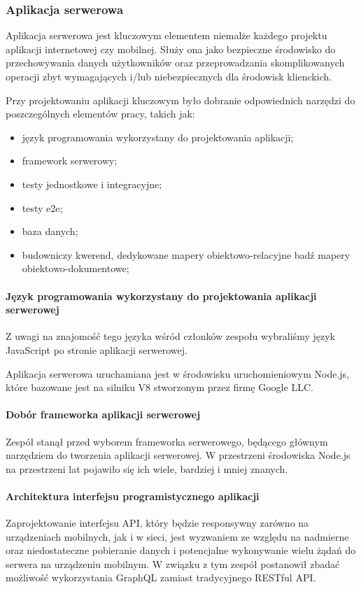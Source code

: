 \documentclass[12pt, a4paper, twoside, openany]{book}
\newcommand{\forceindent}{\leavevmode{\parindent=1.3em\indent}}
\begin{document}
{\subsubsection{Aplikacja serwerowa}

\forceindent Aplikacja serwerowa jest kluczowym elementem niemalże każdego projektu aplikacji
internetowej czy mobilnej. Służy ona jako bezpieczne środowisko do przechowywania danych
użytkowników oraz przeprowadzania skomplikowanych operacji zbyt wymagających i/lub
niebezpiecznych dla środowisk klienckich.

Przy projektowaniu aplikacji kluczowym było dobranie odpowiednich narzędzi do
poszczególnych elementów pracy, takich jak:
\begin{itemize}
    \item język programowania wykorzystany do projektowania aplikacji;
    \item framework serwerowy;
    \item testy jednostkowe i integracyjne;
    \item testy e2e;
    \item baza danych;
    \item budowniczy kwerend, dedykowane mapery obiektowo-relacyjne badź mapery obiektowo-dokumentowe;
\end{itemize}

\paragraph{Język programowania wykorzystany do projektowania aplikacji serwerowej\\}

\forceindent Z uwagi na znajomość tego języka wśród członków zespołu wybraliśmy język JavaScript
po stronie aplikacji serwerowej.

Aplikacja serwerowa uruchamiana jest w środowisku uruchomieniowym Node.js, które bazowane jest na
silniku V8 stworzonym przez firmę Google LLC.

\paragraph{Dobór frameworka aplikacji serwerowej\\}
\forceindent Zespół stanął przed wyborem frameworka serwerowego, będącego głównym narzędziem do tworzenia aplikacji serwerowej.
W przestrzeni środowiska Node.js na przestrzeni lat pojawiło się ich wiele, bardziej i
mniej znanych.

\paragraph{Architektura interfejsu programistycznego aplikacji\\}
\forceindent Zaprojektowanie interfejsu API, który będzie responsywny zarówno na urządzeniach mobilnych, jak i w sieci, jest wyzwaniem ze względu na nadmierne oraz niedostateczne pobieranie danych i potencjalne wykonywanie wielu żądań do serwera na urządzeniu mobilnym.
W związku z tym zespół postanowił zbadać możliwość wykorzystania GraphQL zamiast tradycyjnego RESTful API.

}
\end{document}
